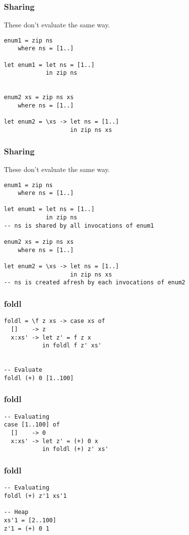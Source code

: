 \documentclass{beamer}
\begin{document}
\begin{frame}[t,fragile]
\frametitle{Sharing}

These don't evaluate the same way.

\begin{verbatim}
enum1 = zip ns
    where ns = [1..]

let enum1 = let ns = [1..]
            in zip ns


enum2 xs = zip ns xs
    where ns = [1..]

let enum2 = \xs -> let ns = [1..]
                   in zip ns xs
\end{verbatim}
\end{frame}

\begin{frame}[t,fragile]
\frametitle{Sharing}

These don't evaluate the same way.

\begin{verbatim}
enum1 = zip ns
    where ns = [1..]

let enum1 = let ns = [1..]
            in zip ns
-- ns is shared by all invocations of enum1

enum2 xs = zip ns xs
    where ns = [1..]

let enum2 = \xs -> let ns = [1..]
                   in zip ns xs
-- ns is created afresh by each invocations of enum2
\end{verbatim}
\end{frame}

\begin{frame}[fragile]
\frametitle{foldl}
\begin{verbatim}
foldl = \f z xs -> case xs of
  []    -> z
  x:xs' -> let z' = f z x
           in foldl f z' xs'


-- Evaluate
foldl (+) 0 [1..100]           
\end{verbatim}
\end{frame}

\begin{frame}[t,fragile]
\frametitle{foldl}
\begin{verbatim}
-- Evaluating
case [1..100] of
  []    -> 0
  x:xs' -> let z' = (+) 0 x
           in foldl (+) z' xs'
\end{verbatim}
\end{frame}

\begin{frame}[t,fragile]
\frametitle{foldl}
\begin{verbatim}
-- Evaluating
foldl (+) z'1 xs'1

-- Heap
xs'1 = [2..100]
z'1 = (+) 0 1
\end{verbatim}
\end{frame}
\end{document}
